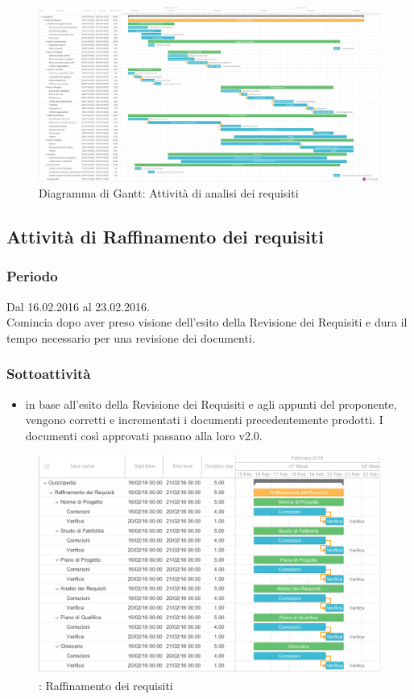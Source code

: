 \documentclass[a4paper, titlepage]{article}
\begin{document}
\newpage
\begin{figure}
\includegraphics[scale=0.25]{Img/Grafici_Gantt/Analisi_dei_requisiti.pdf}
\caption{ Diagramma di Gantt: Attività di analisi dei requisiti}
\end{figure}

\subsection{Attività di Raffinamento dei requisiti}
\subsubsection{Periodo}
Dal 16.02.2016 al 23.02.2016.\\
Comincia dopo aver preso visione dell'esito della Revisione dei Requisiti e dura il tempo necessario per una revisione dei documenti.


\subsubsection{Sottoattività}
\begin{itemize}
	\item {} in base all'esito della Revisione dei Requisiti e agli appunti del proponente, vengono corretti e incrementati i documenti precedentemente prodotti. I documenti così approvati passano alla loro v2.0.
\end{itemize}

\newpage
\begin{figure}
    \includegraphics[scale=0.7]{Img/Grafici_Gantt/Raffinamento_requisiti.pdf}
	\caption{ : Raffinamento dei requisiti}
\end{figure}
\end{document}
